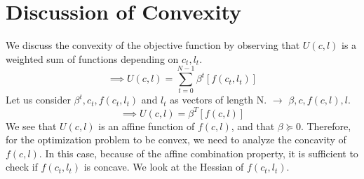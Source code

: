 \section*{Discussion of Convexity}\label{ch:ch2label}
We discuss the convexity of the objective function by observing that $U(c,l)$ is a weighted sum of functions depending on $c_{t}, l_{t}$.
\\
\begin{equation*}
\implies U(c,l) = \sum_{t=0}^{N-1}{\beta^{t}}[f(c_t,l_t)]
\end{equation*}
Let us consider $\beta^t, c_t, f(c_t, l_t)$ and $l_t$ as vectors of length N. $\rightarrow$ $\beta, c, f(c, l), l$.
\begin{equation*}
\implies U(c,l) = \beta^T[f(c,l)]
\end{equation*}
We see that $U(c,l)$ is an affine function of $f(c,l)$, and that $\beta \succeq 0$. Therefore, for the optimization problem to be convex, we need to analyze the concavity of $f(c,l)$. In this case, because of the affine combination property, it is sufficient to check if $f(c_t,l_t)$ is concave. We look at the Hessian of $f(c_t,l_t)$.\\

